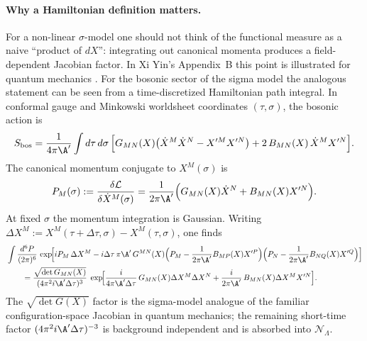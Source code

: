 \documentclass[12pt]{article}
\begin{document}
\paragraph{Why a Hamiltonian definition matters.}
For a non-linear $\sigma$-model one should not think of the functional measure
as a naive ``product of $dX$'': integrating out canonical momenta produces a
field-dependent Jacobian factor. In Xi Yin's Appendix~B this point is
illustrated for quantum mechanics \cite[Eq.~(B.4)]{Yin:FoundationsStringTheory}.
For the bosonic sector of the sigma model the analogous statement can be seen
from a time-discretized Hamiltonian path integral. In conformal gauge and
Minkowski worldsheet coordinates $(\tau,\sigma)$, the bosonic action is
\begin{equation}
  S_{\mathrm{bos}}
  =
  \frac{1}{4\pi \A'}\int d\tau\,d\sigma\,
  \Bigl[
    G_{MN}(X)\bigl(\dot X^M \dot X^N - X'^M X'^N\bigr)
    + 2\,B_{MN}(X)\,\dot X^M X'^N
  \Bigr].
  \label{eq:nlsm-bos-action-hamiltonian}
\end{equation}
The canonical momentum conjugate to $X^M(\sigma)$ is
\begin{equation}
  P_M(\sigma)
  :=
  \frac{\delta \mathcal{L}}{\delta \dot X^M(\sigma)}
  =
  \frac{1}{2\pi \A'}\Bigl(G_{MN}(X)\dot X^N + B_{MN}(X)X'^N\Bigr).
  \label{eq:nlsm-canonical-momentum}
\end{equation}
At fixed $\sigma$ the momentum integration is Gaussian. Writing
$\Delta X^M:=X^M(\tau+\Delta\tau,\sigma)-X^M(\tau,\sigma)$, one finds
\begin{equation}
  \begin{aligned}
    &\int \frac{d^6 P}{(2\pi)^6}\,
    \exp\!\Bigl[
      i P_M\,\Delta X^M
      - i\Delta\tau\,\pi \A'\,
      G^{MN}(X)\Bigl(P_M-\frac{1}{2\pi \A'}B_{MP}(X)X'^P\Bigr)
      \Bigl(P_N-\frac{1}{2\pi \A'}B_{NQ}(X)X'^Q\Bigr)
    \Bigr]
    \\
    &\qquad=
    \frac{\sqrt{\det G_{MN}(X)}}{(4\pi^2 i \A'\Delta\tau)^3}\;
    \exp\!\Bigl[
      \frac{i}{4\pi \A'\Delta\tau}\,G_{MN}(X)\Delta X^M\Delta X^N
      +\frac{i}{2\pi \A'}\,B_{MN}(X)\Delta X^M X'^N
    \Bigr].
  \end{aligned}
  \label{eq:nlsm-integrate-out-momenta}
\end{equation}
The $\sqrt{\det G(X)}$ factor is the sigma-model analogue of the familiar
configuration-space Jacobian in quantum mechanics; the remaining short-time
factor $(4\pi^2 i\A'\Delta\tau)^{-3}$ is background independent and is
absorbed into $\mathcal{N}_\Lambda$.
\end{document}
